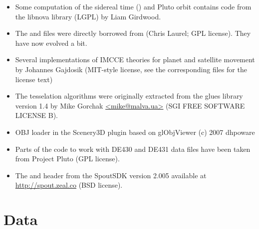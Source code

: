 \begin{itemize}		
  \item Some computation of the sidereal time () and Pluto
      orbit contains code from the libnova library (LGPL) by Liam Girdwood.
  \item The  and  files were directly borrowed from
       (Chris Laurel; GPL license). They have now evolved a bit.
  \item Several implementations of IMCCE theories for planet and satellite movement by Johannes Gajdosik 
       (MIT-style license, see the corresponding files for the license text)
  \item The tesselation algorithms were originally extracted from the glues 
      library version 1.4 by Mike Gorchak \url{<mike@malva.ua>} (SGI FREE SOFTWARE LICENSE B).
  \item OBJ loader in the Scenery3D plugin based on glObjViewer (c) 2007 dhpoware
  \item Parts of the code to work with DE430 and DE431 data files have been taken from Project Pluto (GPL license).
  \item The  and header from the SpoutSDK version 2.005 available at \url{http://spout.zeal.co} (BSD license).
\end{itemize}

\section{Data}
\label{sec:ack:data}

